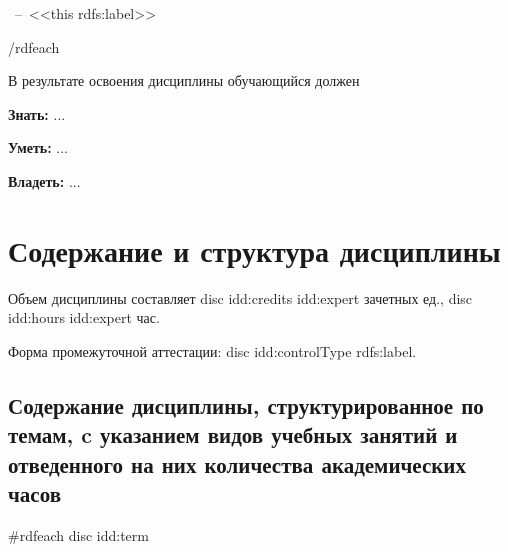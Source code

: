 \documentclass[12pt]{scrartcl}
\newcommand{\rdf}[2]{#2}
\newenvironment{rdfctx}[1]{}{}
\renewcommand{\paragraph}[1]{\par\textbf{#1}}
\begin{document}
\ --\ <<{{this rdfs:label}}>> \par

{{/rdfeach}}

\begin{rdfctx}{\rdfsetctx{dc}{syll wpdd:courseDC !wpdd:CourseDC}}
В результате освоения дисциплины обучающийся должен

\paragraph{Знать: } \rdf{dc wpdd:know !cnt:ContentAsText}{...}

\paragraph{Уметь: } \rdf{dc wpdd:ableTo !cnt:ContentAsText}{...}

\paragraph{Владеть: } \rdf{dc wpdd:posess !cnt:ContentAsText}{...}
\end{rdfctx}

\section{Содержание и структура дисциплины}

Объем дисциплины составляет {{disc idd:credits idd:expert}} зачетных ед., {{disc idd:hours idd:expert}} час.

Форма промежуточной аттестации: {{disc idd:controlType rdfs:label}}.

\subsection{Содержание дисциплины, структурированное по темам, c указанием видов
  учебных занятий и отведенного на них количества академических часов} %
{{#rdfeach disc idd:term }}
\end{document}
